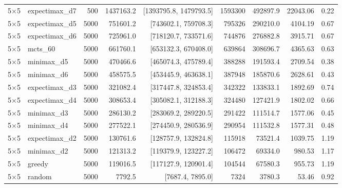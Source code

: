 {\begin{longtable}{llrrrrrrr}
5$\times$5 & expectimax\_d7 & 500 & 1437163.2 & [1393795.8, 1479793.5] & 1593300 & 492897.9 & 22043.06 & 0.22 \\
5$\times$5 & expectimax\_d5 & 5000 & 751601.2 & [743602.1, 759708.3] & 795326 & 290210.0 & 4104.19 & 0.67 \\
5$\times$5 & expectimax\_d6 & 5000 & 725961.0 & [718120.7, 733571.6] & 744876 & 276882.8 & 3915.71 & 0.67 \\
5$\times$5 & mcts\_60 & 5000 & 661760.1 & [653132.3, 670408.0] & 639864 & 308696.7 & 4365.63 & 0.63 \\
5$\times$5 & minimax\_d5 & 5000 & 470466.6 & [465074.3, 475789.4] & 388288 & 191593.4 & 2709.54 & 0.38 \\
5$\times$5 & minimax\_d6 & 5000 & 458575.5 & [453445.9, 463638.1] & 387948 & 185870.6 & 2628.61 & 0.43 \\
5$\times$5 & expectimax\_d3 & 5000 & 321082.4 & [317447.8, 324853.4] & 342322 & 133833.1 & 1892.69 & 0.74 \\
5$\times$5 & expectimax\_d4 & 5000 & 308653.4 & [305082.1, 312188.3] & 324480 & 127421.9 & 1802.02 & 0.66 \\
5$\times$5 & minimax\_d3 & 5000 & 286130.2 & [283069.2, 289220.5] & 291422 & 111514.7 & 1577.06 & 0.45 \\
5$\times$5 & minimax\_d4 & 5000 & 277522.1 & [274450.9, 280536.9] & 290954 & 111532.8 & 1577.31 & 0.48 \\
5$\times$5 & expectimax\_d2 & 5000 & 130761.6 & [128757.9, 132824.8] & 115918 & 73521.4 & 1039.75 & 1.19 \\
5$\times$5 & minimax\_d2 & 5000 & 121313.2 & [119379.9, 123227.2] & 106472 & 69334.0 & 980.53 & 1.17 \\
5$\times$5 & greedy & 5000 & 119016.5 & [117127.9, 120901.4] & 104544 & 67580.3 & 955.73 & 1.19 \\
5$\times$5 & random & 5000 & 7792.5 & [7687.4, 7895.0] & 7324 & 3780.3 & 53.46 & 0.92 \\
\midrule
\bottomrule
\end{longtable}
}